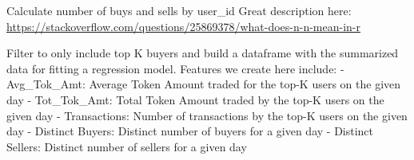 \documentclass[]{article}
\newenvironment{Shaded}{\begin{snugshade}}{\end{snugshade}}
\newcommand{\KeywordTok}[1]{\textcolor[rgb]{0.13,0.29,0.53}{\textbf{#1}}}
\newcommand{\DataTypeTok}[1]{\textcolor[rgb]{0.13,0.29,0.53}{#1}}
\newcommand{\StringTok}[1]{\textcolor[rgb]{0.31,0.60,0.02}{#1}}
\newcommand{\OperatorTok}[1]{\textcolor[rgb]{0.81,0.36,0.00}{\textbf{#1}}}
\newcommand{\NormalTok}[1]{#1}
\begin{document}
Calculate number of buys and sells by user\_id Great description here:
\url{https://stackoverflow.com/questions/25869378/what-does-n-n-mean-in-r}

\begin{Shaded}
\end{Shaded}

Filter to only include top K buyers and build a dataframe with the
summarized data for fitting a regression model. Features we create here
include: - Avg\_Tok\_Amt: Average Token Amount traded for the top-K
users on the given day - Tot\_Tok\_Amt: Total Token Amount traded by the
top-K users on the given day - Transactions: Number of transactions by
the top-K users on the given day - Distinct Buyers: Distinct number of
buyers for a given day - Distinct Sellers: Distinct number of sellers
for a given day
\end{document}
